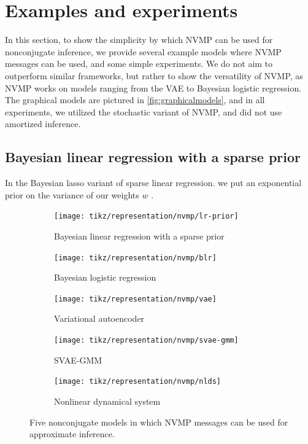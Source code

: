 \section{Examples and experiments}
\label{sec:examples}

In this section, to show the simplicity by
which NVMP can be used for nonconjugate inference,
we provide several example models 
where NVMP messages can be used, and some simple
experiments. We do not aim to outperform
similar frameworks, but rather to show the versatility of NVMP, as NVMP works on models ranging from the VAE to Bayesian logistic regression.
The graphical models are pictured in \autoref{fig:graphicalmodels},
and in all experiments, we utilized the stochastic variant
of NVMP, and did not use amortized inference.

\subsection{Bayesian linear regression with a sparse prior}

In the Bayesian lasso variant of sparse linear regression.
we put an exponential prior on the variance of our weights $w$ \cite{bayesianlasso}.

\begin{figure}
    \centering
    \begin{subfigure}[t]{0.19\textwidth}
        \centering
        \texttt{[image: tikz/representation/nvmp/lr-prior]}
        \caption{Bayesian linear regression with a sparse prior}
    \end{subfigure}
    \hfill
    \begin{subfigure}[t]{0.19\textwidth}
        \centering
        \texttt{[image: tikz/representation/nvmp/blr]}
        \caption{Bayesian logistic regression}
    \end{subfigure}
    \hfill
    \begin{subfigure}[t]{0.19\textwidth}
        \centering
        \texttt{[image: tikz/representation/nvmp/vae]}
        \caption{Variational autoencoder}
    \end{subfigure}
    \begin{subfigure}[t]{0.19\textwidth}
        \centering
        \texttt{[image: tikz/representation/nvmp/svae-gmm]}
        \caption{SVAE-GMM}
    \end{subfigure}
    \begin{subfigure}[t]{0.19\textwidth}
        \centering
        \texttt{[image: tikz/representation/nvmp/nlds]}
        \caption{Nonlinear dynamical system}
    \end{subfigure}
    \caption{Five nonconjugate models in which NVMP messages can be used for approximate inference.}
    \label{fig:graphicalmodels}
\end{figure}

